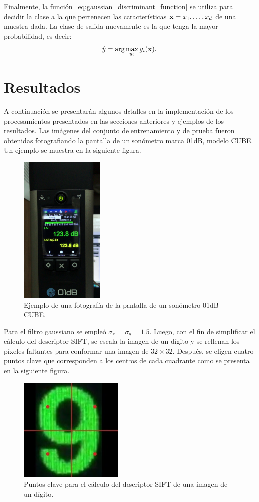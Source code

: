 Finalmente, la función~\eqref{eq:gaussian_discriminant_function} se utiliza para decidir la clase a la que pertenecen las características $\mathrm{\mathbf{x}} = x_1, \dots, x_d$ de una muestra dada.
La clase de salida nuevamente es la que tenga la mayor probabilidad, es decir:
%
\begin{equation}
    \hat{y} = \arg\max_{y_i} g_i(\mathrm{\mathbf{x}}).
\end{equation}
\vfill

\section*{Resultados}
A continuación se presentarán algunos detalles en la implementación de los procesamientos presentados en las secciones anteriores y ejemplos de los resultados.
Las imágenes del conjunto de entrenamiento y de prueba fueron obtenidas fotografiando la pantalla de un sonómetro marca 01dB, modelo CUBE. Un ejemplo se muestra en la siguiente figura.
%
\begin{figure}[h]
    \caption{Ejemplo de una fotografía de la pantalla de un sonómetro 01dB CUBE.}
    \label{fig:slm_screen}
    \centering
    \includegraphics[height=7.2cm]{3_reconocimiento/Figs/slm_screen}
\end{figure}

Para el filtro gaussiano se empleó $\sigma_x = \sigma_y = \num{1.5}$.
Luego, con el fin de simplificar el cálculo del descriptor SIFT, se escala la imagen de un dígito y se rellenan los píxeles faltantes para conformar una imagen de $32 \times 32$.
Después, se eligen cuatro puntos clave que corresponden a los centros de cada cuadrante como se presenta en la siguiente figura.
%
\begin{figure}[h]
    \caption{Puntos clave para el cálculo del descriptor SIFT de una imagen de un dígito.}
    \label{fig:keypoints_SIFT}
    \centering
    \includegraphics[height=5cm]{3_Reconocimiento/Figs/keypoints_SIFT}
\end{figure}

